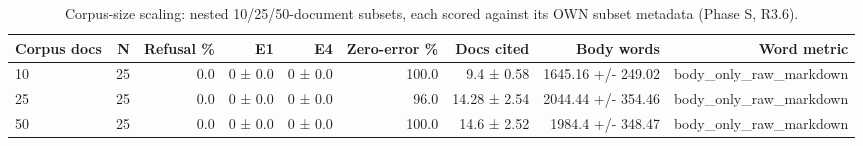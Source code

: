 \begin{table}[ht]
\centering
\caption{Corpus-size scaling: nested 10/25/50-document subsets, each scored against its OWN subset metadata (Phase S, R3.6).}
\begin{tabular}{lrrrrrrrr}
\toprule
Corpus docs & N & Refusal \% & E1 & E4 & Zero-error \% & Docs cited & Body words & Word metric \\
\midrule
10 & 25 & 0.0 & 0 ± 0.0 & 0 ± 0.0 & 100.0 & 9.4 ± 0.58 & 1645.16 +/- 249.02 & body\_only\_raw\_markdown \\
25 & 25 & 0.0 & 0 ± 0.0 & 0 ± 0.0 & 96.0 & 14.28 ± 2.54 & 2044.44 +/- 354.46 & body\_only\_raw\_markdown \\
50 & 25 & 0.0 & 0 ± 0.0 & 0 ± 0.0 & 100.0 & 14.6 ± 2.52 & 1984.4 +/- 348.47 & body\_only\_raw\_markdown \\
\bottomrule
\end{tabular}
\end{table}
